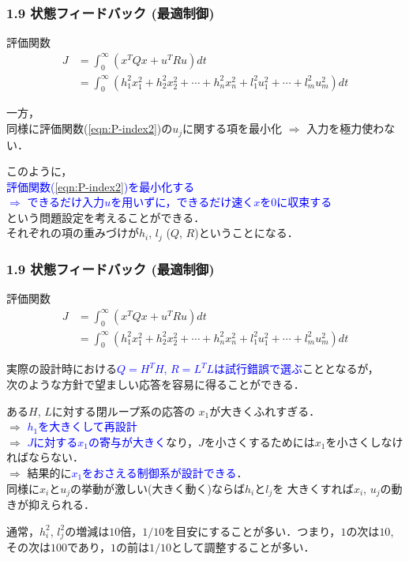 \documentclass[10pt]{beamer}
\begin{document}
\begin{frame}[t]
\frametitle{1.9 状態フィードバック (最適制御)}
評価関数
\begin{align}
 J
 &= \int_{0}^{\infty} (x^T Q x + u^T R u) dt \nonumber \\
 &= \int_0^{\infty} (h_1^2 x_1^2 + h_2^2 x_2^2 + \cdots +
     h_n^2 x_n^2 + l_1^2 u_1^2 + \cdots + l_m^2 u_m^2)dt

\end{align}

一方，\\
同様に評価関数(\ref{eqn:P-index2})の$u_j$に関する項を最小化
$\Longrightarrow$ 入力を極力使わない．

 

このように，\\
\textcolor{blue}{評価関数(\ref{eqn:P-index2})を最小化する\\
$\Longrightarrow$ できるだけ入力$u$を用いずに，できるだけ速く$x$を$0$に収束する\\}という問題設定を考えることができる．\\
それぞれの項の重みづけが$h_i$, $l_j$ ($Q$, $R$)ということになる．
\end{frame}


\begin{frame}[t]
\frametitle{1.9 状態フィードバック (最適制御)}
評価関数
\begin{align}
 J
 &= \int_{0}^{\infty} (x^T Q x + u^T R u) dt \nonumber \\
 &= \int_0^{\infty} (h_1^2 x_1^2 + h_2^2 x_2^2 + \cdots +
     h_n^2 x_n^2 + l_1^2 u_1^2 + \cdots + l_m^2 u_m^2)dt

\end{align}

実際の設計時における\textcolor{blue}{$Q=H^TH$, $R=L^TL$は試行錯誤で選ぶ}こととなるが，\\
次のような方針で望ましい応答を容易に得ることができる．

 

ある$H$, $L$に対する閉ループ系の応答の
$x_1$が大きくふれすぎる．\\
$\Longrightarrow$ \textcolor{blue}{$h_1$を大きくして再設計}\\
$\Longrightarrow$ \textcolor{blue}{$J$に対する$x_1$の寄与が大きく}なり，$J$を小さくするためには$x_1$を小さくしなければならない．\\
$\Longrightarrow$ 結果的に\textcolor{blue}{$x_1$をおさえる制御系が設計できる}．\\

 

同様に$x_i$と$u_j$の挙動が激しい(大きく動く)ならば$h_i$と$l_j$を
大きくすれば$x_i$, $u_j$の動きが抑えられる．

通常，$h_i^2$, $l_j^2$の増減は$10$倍，$1/10$を目安にすることが多い．つまり，$1$の次は$10$, その次は$100$であり，$1$の前は$1/10$として調整することが多い．

\end{frame}
\end{document}
